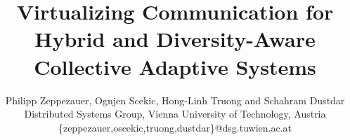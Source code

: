 

\usepackage{soul} %
\usepackage{color}
\usepackage{paralist} %
\usepackage{float}    %
\usepackage{placeins} %
\usepackage{gensymb}  %


\newcommand{\mdl}{\textsc{SmartCom}}

\newcommand{\figcol}[3][0.9]{
\begin{figure}[H] %
\centering
\texttt{[image: figures/\#2]}
\caption{#3}
\label{fig:#2}
\end{figure}
}

\newcommand{\figcoltop}[3][0.9]{
\begin{figure}[t] %
\centering
\texttt{[image: figures/\#2]}
\caption{#3}
\label{fig:#2}
\end{figure}
}

\newcommand{\figfull}[3][0.9]{
\begin{figure*}[t]
\centering
\texttt{[image: figures/\#2]}
\caption{#3}
\label{fig:#2}
\end{figure*}
}



%
\title{Virtualizing Communication for Hybrid and Diversity-Aware Collective Adaptive Systems}
\author{
  \IEEEauthorblockN
  {
    Philipp Zeppezauer,
    Ognjen Scekic, 
    Hong-Linh Truong and
    Schahram Dustdar
  }
  \IEEEauthorblockA
  {
    Distributed Systems Group, Vienna University of Technology, Austria\\
    \{zeppezauer,oscekic,truong,dustdar\}@dsg.tuwien.ac.at
  }
}



